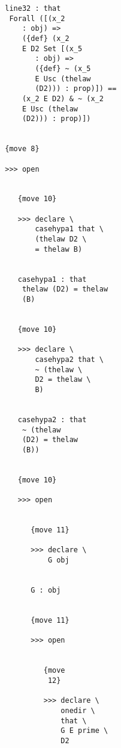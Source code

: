 \documentclass[12pt]{article}
\begin{document}
\begin{verbatim}
                           line32 : that 
                            Forall ([(x_2 
                               : obj) => 
                               ({def} (x_2 
                               E D2 Set [(x_5 
                                  : obj) => 
                                  ({def} ~ (x_5 
                                  E Usc (thelaw 
                                  (D2))) : prop)]) == 
                               (x_2 E D2) & ~ (x_2 
                               E Usc (thelaw 
                               (D2))) : prop)])


                           {move 8}

                           >>> open


                              {move 10}

                              >>> declare \
                                  casehypa1 that \
                                  (thelaw D2 \
                                  = thelaw B)


                              casehypa1 : that 
                               thelaw (D2) = thelaw 
                               (B)


                              {move 10}

                              >>> declare \
                                  casehypa2 that \
                                  ~ (thelaw \
                                  D2 = thelaw \
                                  B)


                              casehypa2 : that 
                               ~ (thelaw 
                               (D2) = thelaw 
                               (B))


                              {move 10}

                              >>> open


                                 {move 11}

                                 >>> declare \
                                     G obj


                                 G : obj


                                 {move 11}

                                 >>> open


                                    {move 
                                     12}

                                    >>> declare \
                                        onedir \
                                        that \
                                        G E prime \
                                        D2



\end{verbatim}
\end{document}
